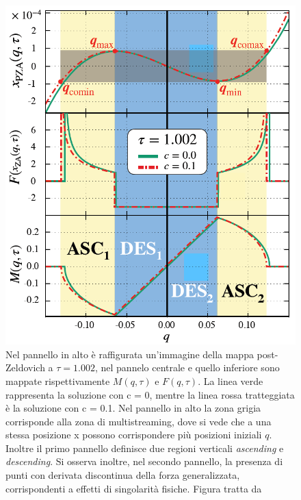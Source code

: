 \begin{center}
    \begin{figure}[H]
        \centering
        \includegraphics[scale=0.5, angle=0]{fig1.png}
        \caption{Nel pannello in alto è raffigurata un'immagine della mappa post-Zeldovich a $\tau=1.002$,
        nel pannelo centrale e quello inferiore sono mappate rispettivamente $M(q, \tau)$ e $F(q, \tau)$.
        La linea verde rappresenta la soluzione con c = 0, mentre la linea rossa tratteggiata è la soluzione
        con c = 0.1. Nel pannello in alto la zona grigia corrisponde alla zona di multistreaming, dove si
        vede che a una stessa posizione x possono corrispondere più posizioni iniziali $q$. Inoltre il primo 
        pannello definisce due regioni verticali \textit{ascending} e \textit{descending}.
        Si osserva inoltre, nel secondo pannello, la presenza di punti con derivata discontinua della forza
        generalizzata, corrispondenti a effetti di singolarità fisiche. Figura tratta da \cite{rampf}
        }
        \label{fig:fig1}
	\end{figure}
\end{center}

